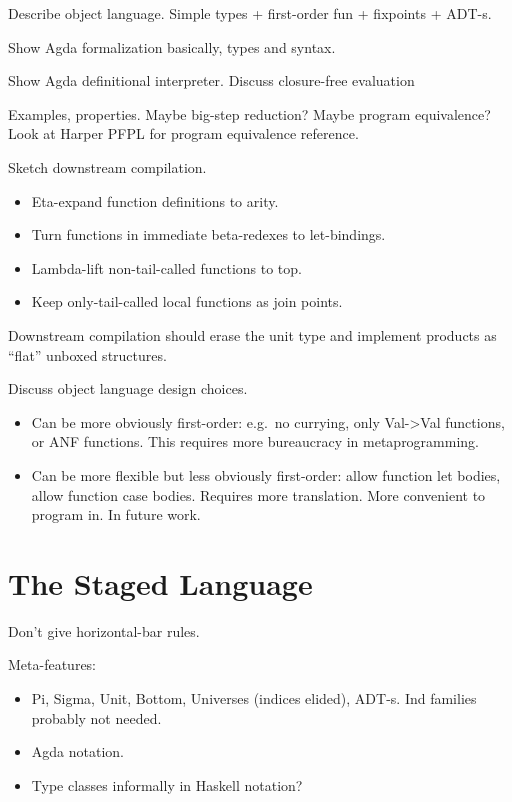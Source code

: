 \documentclass[acmsmall,screen,review,anonymous]{acmart}
\theoremstyle{remark}
\begin{document}
Describe object language. Simple types + first-order fun + fixpoints + ADT-s.

Show Agda formalization basically, types and syntax.

Show Agda definitional interpreter. Discuss closure-free evaluation

Examples, properties. Maybe big-step reduction? Maybe program equivalence?  Look
at Harper PFPL for program equivalence reference.

Sketch downstream compilation.
\begin{itemize}
\item Eta-expand function definitions to arity.
\item Turn functions in immediate beta-redexes to let-bindings.
\item Lambda-lift non-tail-called functions to top.
\item Keep only-tail-called local functions as join points.
\end{itemize}

Downstream compilation should erase the unit type and implement products as
``flat'' unboxed structures.

Discuss object language design choices.
\begin{itemize}
\item Can be more obviously first-order: e.g.\ no currying, only Val->Val
  functions, or ANF functions. This requires more bureaucracy in
  metaprogramming.
\item Can be more flexible but less obviously first-order: allow function let
  bodies, allow function case bodies. Requires more translation. More convenient
  to program in. In future work.
\end{itemize}

\section{The Staged Language}\label{sec:the-staged-language}

Don't give horizontal-bar rules.

Meta-features:
\begin{itemize}
\item Pi, Sigma, Unit, Bottom, Universes (indices elided), ADT-s. Ind families probably not needed.
\item Agda notation.
\item Type classes informally in Haskell notation?
\end{itemize}
\end{document}
